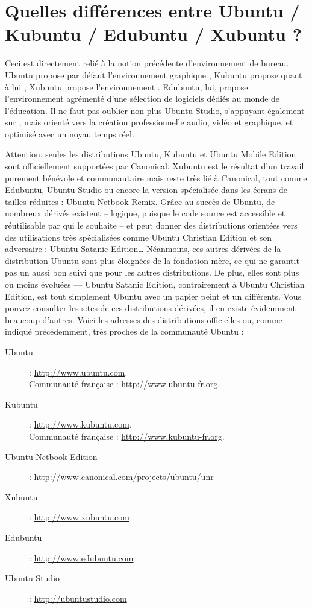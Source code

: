 \section{Quelles différences entre Ubuntu / Kubuntu / Edubuntu / Xubuntu ?}
Ceci est directement relié à la notion précédente d'environnement de bureau. Ubuntu propose par défaut l'environnement graphique , Kubuntu propose quant à lui , Xubuntu propose l'environnement . Edubuntu, lui, propose l'environnement  agrémenté d'une sélection de logiciels dédiés au monde de l'éducation. Il ne faut pas oublier non plus Ubuntu Studio, s'appuyant également sur , mais orienté vers la création professionnelle audio, vidéo et graphique, et optimisé avec un noyau temps réel.\par
Attention, seules les distributions Ubuntu, Kubuntu et Ubuntu Mobile Edition sont officiellement supportées par Canonical. Xubuntu est le résultat d'un travail purement bénévole et communautaire mais reste très lié à Canonical, tout comme Edubuntu, Ubuntu Studio ou encore la version spécialisée dans les écrans de tailles réduites : Ubuntu Netbook Remix. Grâce au succès de Ubuntu, de nombreux dérivés existent -- logique, puisque le code source est accessible et réutilisable par qui le souhaite -- et peut donner des distributions orientées vers des utilisations très spécialisées comme Ubuntu Christian Edition et son adversaire : Ubuntu Satanic Edition\ldots{} Néanmoins, ces autres dérivées de la distribution Ubuntu sont plus éloignées de la fondation mère, ce qui ne garantit pas un aussi bon suivi que pour les autres distributions. De plus, elles sont plus ou moins évoluées --- Ubuntu Satanic Edition, contrairement à Ubuntu Christian Edition, est tout simplement Ubuntu avec un papier peint et un  différents. Vous pouvez consulter les sites de ces distributions dérivées, il en existe évidemment beaucoup d'autres. Voici les adresses des distributions officielles ou, comme indiqué précédemment, très proches de la communauté Ubuntu :
\begin{description}
\item [Ubuntu] : \url{http://www.ubuntu.com}.\\Communauté française : \url{http://www.ubuntu-fr.org}.
\item [Kubuntu] : \url{http://www.kubuntu.com}.\\Communauté française : \url{http://www.kubuntu-fr.org}. 
\item [Ubuntu Netbook Edition] : \url{http://www.canonical.com/projects/ubuntu/unr}
\item [Xubuntu] : \url{http://www.xubuntu.com}
\item [Edubuntu] : \url{http://www.edubuntu.com}
\item [Ubuntu Studio] : \url{http://ubuntustudio.com}
\end{description}
